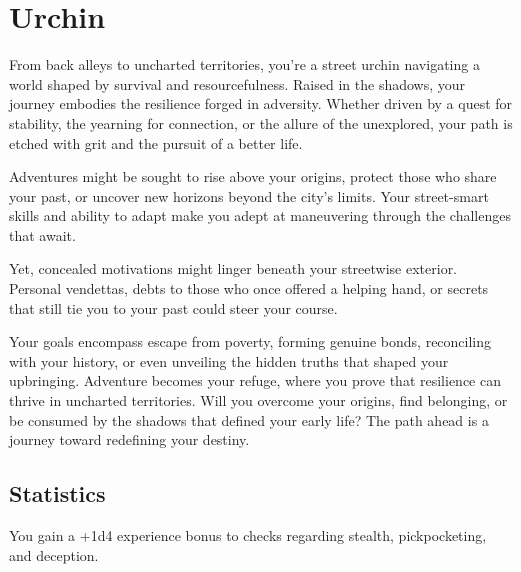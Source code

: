 \section{Urchin}\label{background:urchin}
From back alleys to uncharted territories, you're a street urchin navigating a world shaped by survival and resourcefulness.
Raised in the shadows, your journey embodies the resilience forged in adversity.
Whether driven by a quest for stability, the yearning for connection, or the allure of the unexplored, your path is etched with grit and the pursuit of a better life.

Adventures might be sought to rise above your origins, protect those who share your past, or uncover new horizons beyond the city's limits.
Your street-smart skills and ability to adapt make you adept at maneuvering through the challenges that await.

Yet, concealed motivations might linger beneath your streetwise exterior.
Personal vendettas, debts to those who once offered a helping hand, or secrets that still tie you to your past could steer your course.

Your goals encompass escape from poverty, forming genuine bonds, reconciling with your history, or even unveiling the hidden truths that shaped your upbringing.
Adventure becomes your refuge, where you prove that resilience can thrive in uncharted territories.
Will you overcome your origins, find belonging, or be consumed by the shadows that defined your early life?
The path ahead is a journey toward redefining your destiny.

\subsection{Statistics}
You gain a +1d4 experience bonus to checks regarding stealth, pickpocketing, and deception.
